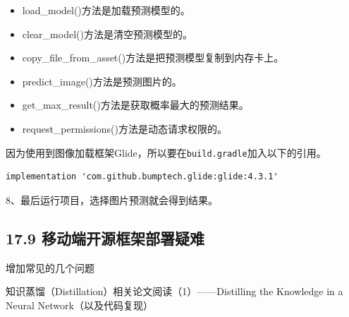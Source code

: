 

\begin{itemize}
\item
  load\_model()方法是加载预测模型的。
\item
  clear\_model()方法是清空预测模型的。
\item
  copy\_file\_from\_asset()方法是把预测模型复制到内存卡上。
\item
  predict\_image()方法是预测图片的。
\item
  get\_max\_result()方法是获取概率最大的预测结果。
\item
  request\_permissions()方法是动态请求权限的。
\end{itemize}

因为使用到图像加载框架Glide，所以要在\texttt{build.gradle}加入以下的引用。

\begin{verbatim}
implementation 'com.github.bumptech.glide:glide:4.3.1'
\end{verbatim}

8、最后运行项目，选择图片预测就会得到结果。

\subsection{17.9
移动端开源框架部署疑难}\label{ux79fbux52a8ux7aefux5f00ux6e90ux6846ux67b6ux90e8ux7f72ux7591ux96be}

增加常见的几个问题

知识蒸馏（Distillation）相关论文阅读（1）------Distilling the Knowledge
in a Neural Network（以及代码复现）

